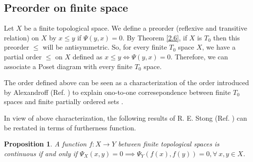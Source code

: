 \documentclass[12pt]{amsart}
\newtheorem{proposition}[definition]{Proposition}
\begin{document}
\subsection{\textbf{Preorder on finite space}} 

Let $X$ be a finite topological space. We define a preorder (reflexive and transitive relation) on $X$ by $x\leq y $ if $ \Psi(y,x)=0$. By Theorem \ref{2.6}, if $X$ is $T_0$ then this preorder $\leq$ will be antisymmetric. So, for every finite $T_0$ space $X$, we have a partial order $\leq $ on $X$ defined as $x\leq y \iff \Psi(y,x)=0$. Therefore, we can associate a Poset diagram with every finite $T_0$ space. %

	
	
	

The order defined above  can be seen as a characterization of the order introduced by Alexandroff (Ref. \cite{Alexandroff}) to explain  ono-to-one  corresepondence between finite $T_0$ spaces and finite partially ordered sets .\par 
In view of above characterization, the following results of R. E. Stong (Ref. \cite{Stong}) can be restated in terms of furtherness function. %


\begin{proposition}\label{3.8.}
	A function $f:X\longrightarrow Y$ between finite topological spaces is continuous if and only if $\Psi_X(x,y)=0\implies \Psi_Y(f(x),f(y))=0,\forall~ x,y\in X$.
\end{proposition}
\end{document}
